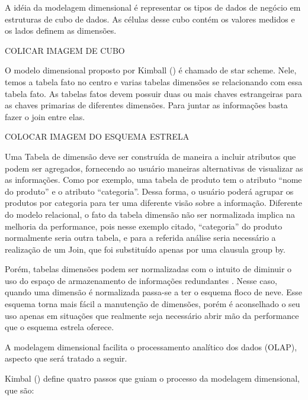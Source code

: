 %

A idéia da modelagem dimensional é representar os tipos de dados de negócio em estruturas de cubo de dados. As células desse cubo contém os valores medidos e os lados definem as dimensões.

COLICAR IMAGEM DE CUBO

%

O modelo dimensional proposto por Kimball (\citeyear{kiball2002}) é chamado de star scheme. Nele, temos a tabela fato no centro e varias tabelas dimensões se relacionando com essa tabela fato. As tabelas fatos devem possuir duas ou mais chaves estrangeiras para as chaves primarias de diferentes dimensões. Para juntar as informações basta fazer o join entre elas.

COLOCAR IMAGEM DO ESQUEMA ESTRELA

%

Uma Tabela de dimensão deve ser construída de maneira a incluir atributos que podem ser agregados, fornecendo ao usuário maneiras alternativas de visualizar as as informações. Como por exemplo, uma tabela de produto tem o atributo “nome do produto” e o atributo “categoria”. Dessa forma, o usuário poderá agrupar os produtos por categoria para ter uma diferente visão sobre a informação. Diferente do modelo relacional, o fato da tabela dimensão não ser normalizada implica na melhoria da performance, pois nesse exemplo citado, “categoria” do produto normalmente seria outra tabela, e para a referida análise seria necessário a realização de um Join, que foi substituído apenas por uma clausula group by.

%

Porém, tabelas dimensões podem ser normalizadas com o intuito de diminuir o uso do espaço de armazenamento de informações redundantes \cite{kimball2002}. Nesse caso, quando uma dimensão é normalizada passa-se a ter o esquema floco de neve. Esse esquema torna mais fácil a manutenção de dimensões, porém é aconselhado o seu uso apenas em situações que realmente seja necessário abrir mão da performance que o esquema estrela oferece.

%

A modelagem dimensional facilita o processamento analítico dos dados (OLAP), aspecto que será tratado a seguir.

%

 Kimbal (\citeyear{kimball2002}) define quatro passos que guiam o processo da modelagem dimensional, que são:



